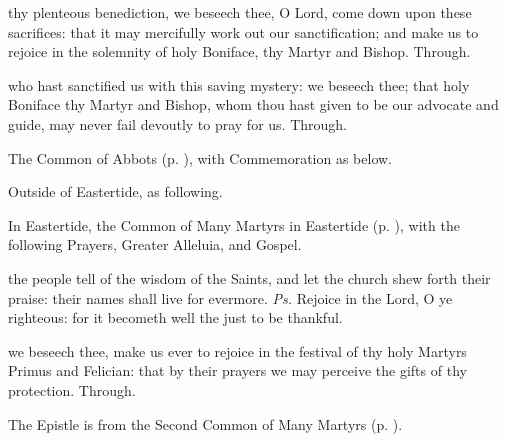 
\secret
{} thy plenteous benediction, we beseech thee, O Lord, come down upon these sacrifices: that it may mercifully work out our sanctification; and make us to rejoice in the solemnity of holy Boniface, thy Martyr and Bishop. Through.


\postcommunion
{} who hast sanctified us with this saving mystery: we beseech thee; that holy Boniface thy Martyr and Bishop, whom thou hast given to be our advocate and guide, may never fail devoutly to pray for us. Through.



\begin{rubric}
	The Common of Abbots (p. \pageref{CommonAbbots}), with Commemoration  as below.
\end{rubric}


\clearpage
{}\label{PrimusFelician}

\begin{rubric}
	Outside of Eastertide, as following.
\end{rubric}

\begin{rubric}
	In Eastertide, the Common of Many Martyrs in Eastertide (p. \pageref{CommonMartyrsEaster}), with the following Prayers, Greater Alleluia, and Gospel.
\end{rubric}

\introit
{} the people tell of the wisdom of the Saints, and let the church shew forth their praise: their names shall live for evermore. \textit{Ps.} Rejoice in the Lord, O ye righteous: for it becometh well the just to be thankful.

\collect
{} we beseech thee, make us ever to rejoice in the festival of thy holy Martyrs Primus and Felician: that by their prayers we may perceive the gifts of thy protection. Through.

\begin{rubric}
	The Epistle is from the Second Common of Many Martyrs (p. \pageref{CommonMartyrsIIEpistle}).
\end{rubric}

